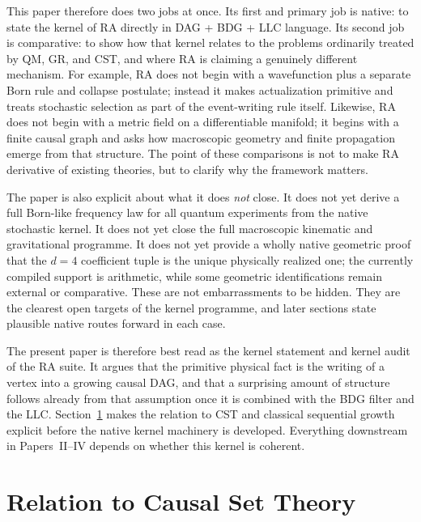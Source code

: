 \documentclass[11pt]{article}
\begin{document}
This paper therefore does two jobs at once. Its first and primary job is native: to state the kernel of RA directly in DAG + BDG + LLC language. Its second job is comparative: to show how that kernel relates to the problems ordinarily treated by QM, GR, and CST, and where RA is claiming a genuinely different mechanism. For example, RA does not begin with a wavefunction plus a separate Born rule and collapse postulate; instead it makes actualization primitive and treats stochastic selection as part of the event-writing rule itself. Likewise, RA does not begin with a metric field on a differentiable manifold; it begins with a finite causal graph and asks how macroscopic geometry and finite propagation emerge from that structure. The point of these comparisons is not to make RA derivative of existing theories, but to clarify why the framework matters.

The paper is also explicit about what it does \emph{not} close. It does not yet derive a full Born-like frequency law for all quantum experiments from the native stochastic kernel. It does not yet close the full macroscopic kinematic and gravitational programme. It does not yet provide a wholly native geometric proof that the $d=4$ coefficient tuple is the unique physically realized one; the currently compiled support is arithmetic, while some geometric identifications remain external or comparative. These are not embarrassments to be hidden. They are the clearest open targets of the kernel programme, and later sections state plausible native routes forward in each case.

The present paper is therefore best read as the kernel statement and kernel audit of the RA suite. It argues that the primitive physical fact is the writing of a vertex into a growing causal DAG, and that a surprising amount of structure follows already from that assumption once it is combined with the BDG filter and the LLC. Section~\ref{sec:relation-cst} makes the relation to CST and classical sequential growth explicit before the native kernel machinery is developed. Everything downstream in Papers~II--IV depends on whether this kernel is coherent.


\section{Relation to Causal Set Theory}
\label{sec:relation-cst}
\end{document}
